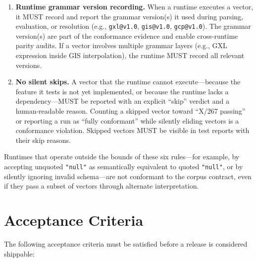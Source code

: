 \begin{enumerate}[label=\arabic*.]
  \item \textbf{Runtime grammar version recording.} When a runtime executes a vector, it MUST record and report the grammar version(s) it used during parsing, evaluation, or resolution (e.g., \texttt{gxl@v1.0}, \texttt{gis@v1.0}, \texttt{gcp@v1.0}). The grammar version(s) are part of the conformance evidence and enable cross-runtime parity audits. If a vector involves multiple grammar layers (e.g., GXL expression inside GIS interpolation), the runtime MUST record all relevant versions.

  \item \textbf{No silent skips.} A vector that the runtime cannot execute—because the feature it tests is not yet implemented, or because the runtime lacks a dependency—MUST be reported with an explicit ``skip'' verdict and a human-readable reason. Counting a skipped vector toward ``X/267 passing'' or reporting a run as ``fully conformant'' while silently eliding vectors is a conformance violation. Skipped vectors MUST be visible in test reports with their skip reasons.

\end{enumerate}

Runtimes that operate outside the bounds of these six rules—for example, by accepting unquoted \texttt{"null"} as semantically equivalent to quoted \texttt{"null"}, or by silently ignoring invalid schema—are not conformant to the corpus contract, even if they pass a subset of vectors through alternate interpretation.

\section{Acceptance Criteria}

The following acceptance criteria must be satisfied before a release is considered shippable:

